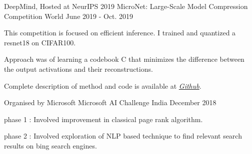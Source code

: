 

\begin{cventries}

  \cventry
    {DeepMind, Hosted at NeurIPS 2019} %
    {MicroNet: Large-Scale Model Compression Competition} %
    {World} %
    {June 2019 - Oct. 2019} %
    {
      \begin{cvitems} %
        \item {This competition is focused on efficient inference. I trained and quantized a resnet18 on CIFAR100.}
         \item {Approach was of learning a codebook C that minimizes the difference between the output activations and their reconstructions.}
        \item {Complete description of method and code is available at
        \emph{\href{https://github.com/GopiKishan14/PunyNet}{Github}}.}
      \end{cvitems}
    }

  \cventry
    {Organised by Microsoft} %
    {Microsoft AI Challenge} %
    {India} %
    {December 2018} %
    {
      \begin{cvitems} %
        \item {phase 1 : Involved improvement in classical page rank algorithm.}
        \item {phase 2 : Involved exploration of NLP based technique to find relevant search results on bing search engines.}
      \end{cvitems}
    }


\end{cventries}
